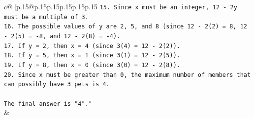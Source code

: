\documentclass{article}
\begin{document}
{\begin{supertabular}{c@{$\;$}|p{.15\linewidth}@{}p{.15\linewidth}p{.15\linewidth}p{.15\linewidth}p{.15\linewidth}p{.15\linewidth}}
{{{\texttt{15. Since x must be an integer, 12 {-} 2y must be a multiple of 3.} \\
\texttt{16. The possible values of y are 2, 5, and 8 (since 12 {-} 2(2) = 8, 12 {-} 2(5) = {-}8, and 12 {-} 2(8) = {-}4).} \\
\texttt{17. If y = 2, then x = 4 (since 3(4) = 12 {-} 2(2)).} \\
\texttt{18. If y = 5, then x = 1 (since 3(1) = 12 {-} 2(5)).} \\
\texttt{19. If y = 8, then x = 0 (since 3(0) = 12 {-} 2(8)).} \\
\texttt{20. Since x must be greater than 0, the maximum number of members that can possibly have 3 pets is 4.} \\
\\ 
\texttt{The final answer is "4"."} \\
            }
        }
    }
    & \\ \\


\end{supertabular}}
\end{document}
